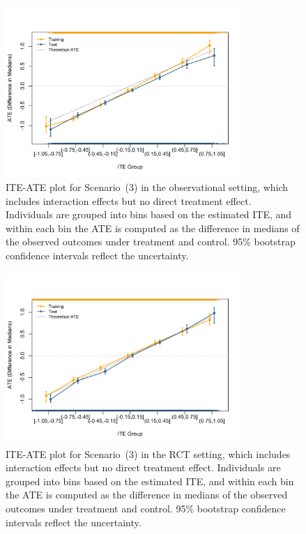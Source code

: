 \begin{figure}[htbp]
\centering
\includegraphics[width=0.8\textwidth]{img/results/observ_scenario3_ITE_ATE.png}
\vspace{-15pt}
\caption{ITE-ATE plot for Scenario~(3) in the observational setting, which includes interaction effects but no direct treatment effect. Individuals are grouped into bins based on the estimated ITE, and within each bin the ATE is computed as the difference in medians of the observed outcomes under treatment and control. 95\% bootstrap confidence intervals reflect the uncertainty.}
\label{fig:observ_scenario3_ite_ATE}
\end{figure}


\begin{figure}[htbp]
\centering
\includegraphics[width=0.8\textwidth]{img/results/rct_scenario3_ITE_ATE.png}
\vspace{-15pt}
\caption{ITE-ATE plot for Scenario~(3) in the RCT setting, which includes interaction effects but no direct treatment effect. Individuals are grouped into bins based on the estimated ITE, and within each bin the ATE is computed as the difference in medians of the observed outcomes under treatment and control. 95\% bootstrap confidence intervals reflect the uncertainty.}
\label{fig:rct_scenario3_ite_ATE}
\end{figure}


